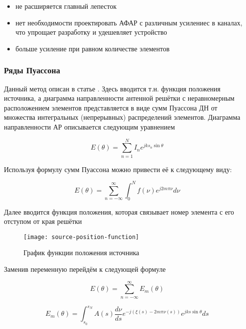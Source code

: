 \begin{itemize}
    \item не расширяется главный лепесток
    \item нет необходимости проектировать АФАР с различным усилениес в каналах, что упрощает разработку
          и удешевляет устройство
    \item больше усиление при равном количестве элементов
\end{itemize}


\subsubsection{Ряды Пуассона}\label{sec:poisson-sum}

Данный метод описан в статье \cite{ishimaru1962theory}. Здесь вводится т.н. функция положения источника,
а диаграмма направленности антенной решётки с неравномерным расположением элементов представляется в виде сумм
Пуассона ДН от множества интегральных (непрерывных) распределений элементов.
Диаграмма направленности АР описывается следующим уравнением

\begin{equation*}
    E(\theta) = \sum_{n=1}^{N} I_n e^{jks_n \sin{\theta}}
\end{equation*}

Используя формулу сумм Пуассона можно привести её к следующему виду:

\begin{equation*}
    E(\theta) = \sum_{n=-\infty}^{\infty} \int_{0}^{N} {f(\nu) e^{j2m\pi\nu} d\nu}
\end{equation*}

Далее вводится функция положения, которая связывает номер элемента с его отступом от края решётки

\begin{figure}[H]
    \centering
    \texttt{[image: source-position-function]}
    \caption{График функции положения источника}%
    \label{fig:source-position-function}
\end{figure}

Заменив переменную перейдём к следующей формуле

\begin{equation*}
    E(\theta) = \sum_{n=-\infty}^{\infty} E_m(\theta)
\end{equation*}

\begin{equation*}
    E_m(\theta) = \int_{s_0}^{s_N} {A(s) \frac{d\nu}{ds} e^{-j(\xi(s)-2m\pi\nu(s))} e^{jks\sin\theta} ds}
\end{equation*}

